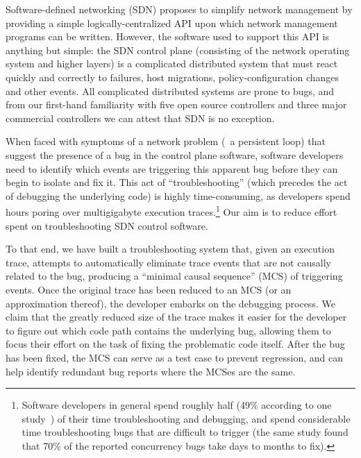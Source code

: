 Software-defined networking (SDN) proposes to simplify network management by
providing a simple logically-centralized API upon which network management
programs can be written. However, the software used to support this API is
anything but simple: the SDN control plane (consisting of the network
operating system and higher layers) is a complicated distributed system that
must react quickly and correctly to failures, host migrations,
policy-configuration changes and other events.
All complicated distributed systems are prone to bugs, and from our first-hand
familiarity with five open source controllers and three major commercial
controllers we can attest that SDN is no exception.

When faced with symptoms of a network problem (\eg~a persistent loop)
that suggest the presence of a bug in the control plane software,
software developers need to identify which events are triggering
this apparent bug before they can begin to isolate and fix it.
This act of ``troubleshooting'' (which precedes the act of debugging the
underlying code) is highly time-consuming, as developers spend hours poring
over multigigabyte execution traces.\footnote{Software developers in general spend roughly half (49\% according to one
study~\cite{msoft_concurrency}) of their time troubleshooting and debugging, and spend
considerable time troubleshooting bugs that are difficult to trigger (the same study found
that 70\% of the reported concurrency bugs take days to months to fix).}
Our aim is to reduce effort spent on troubleshooting SDN control software.

To that end, we have built a troubleshooting system that,
given an execution trace, attempts to automatically eliminate
trace events that are not causally related to the bug, producing a ``minimal
causal sequence'' (MCS) of triggering events. Once the original trace has
been reduced to an MCS (or an approximation thereof), the developer embarks
on the debugging process. We claim that the greatly reduced size of the
trace makes it easier for the developer to figure out which code path contains
the underlying bug, allowing them to focus their effort on
the task of fixing the problematic code itself. After the bug has been fixed, the MCS
can serve as a test case to prevent regression,
and can help identify redundant bug reports where the MCSes are the same.

